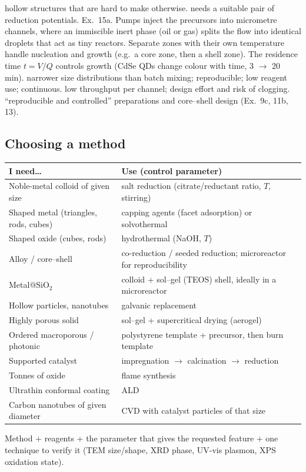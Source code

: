 {hollow structures that are hard to make otherwise.}
{needs a suitable pair of reduction potentials.}
{Ex.~15a.}
{Pumps inject the precursors into micrometre channels, where an immiscible inert phase (oil or gas) splits the flow into
identical droplets that act as tiny reactors. Separate zones with their own temperature handle nucleation and growth (e.g.\ a core
zone, then a shell zone). The residence time $t = V/Q$ controls growth (CdSe QDs change colour with time, 3 $\to$ 20 min).}
{narrower size distributions than batch mixing; reproducible; low reagent use; continuous.}
{low throughput per channel; design effort and risk of clogging.}
{``reproducible and controlled'' preparations and core--shell design (Ex.~9c, 11b, 13).}

\subsection{Choosing a method}
\begin{center}
\small
\renewcommand{\arraystretch}{1.15}
\begin{tabularx}{\linewidth}{@{}>{\raggedright\arraybackslash}p{5.6cm}X@{}}
\toprule
\textbf{I need\ldots} & \textbf{Use (control parameter)} \\ \midrule
Noble-metal colloid of given size & salt reduction (citrate/reductant ratio, $T$, stirring) \\
Shaped metal (triangles, rods, cubes) & capping agents (facet adsorption) or solvothermal \\
Shaped oxide (cubes, rods) & hydrothermal (NaOH, $T$) \\
Alloy / core--shell & co-reduction / seeded reduction; microreactor for reproducibility \\
Metal@SiO$_2$ & colloid + sol--gel (TEOS) shell, ideally in a microreactor \\
Hollow particles, nanotubes & galvanic replacement \\
Highly porous solid & sol--gel + supercritical drying (aerogel) \\
Ordered macroporous / photonic & polystyrene template + precursor, then burn template \\
Supported catalyst & impregnation $\to$ calcination $\to$ reduction \\
Tonnes of oxide & flame synthesis \\
Ultrathin conformal coating & ALD \\
Carbon nanotubes of given diameter & CVD with catalyst particles of that size \\
\bottomrule
\end{tabularx}
\end{center}
\begin{tipbox}
Method + reagents + the parameter that gives the requested feature + one technique to verify it (TEM size/shape, XRD phase,
UV-vis plasmon, XPS oxidation state).
\end{tipbox}

